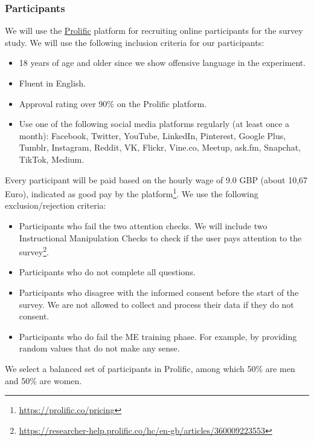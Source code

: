 \subsubsection{Participants}
We will use the \href{https://prolific.co}{Prolific} platform for recruiting online participants for the survey study.
%
We will use the following inclusion criteria for our participants:
\begin{itemize}
    \item 18 years of age and older since we show offensive language in the experiment.
    \item Fluent in English.
    \item Approval rating over 90\% on the Prolific platform.
    \item Use one of the following social media platforms regularly (at least once a month): Facebook, Twitter, YouTube, LinkedIn, Pinterest, Google Plus, Tumblr, Instagram, Reddit, VK, Flickr, Vine.co, Meetup, ask.fm, Snapchat, TikTok, Medium.
\end{itemize}
%
Every participant will be paid based on the hourly wage of 9.0 GBP (about 10,67 Euro), indicated as good pay by the platform\footnote{\url{https://prolific.co/pricing}}.
%
We use the following exclusion/rejection criteria:
\begin{itemize}
    \item Participants who fail the two attention checks. We will include two Instructional Manipulation Checks to check if the user pays attention to the survey\footnote{\url{https://researcher-help.prolific.co/hc/en-gb/articles/360009223553}}.
    \item Participants who do not complete all questions.
    \item Participants who disagree with the informed consent before the start of the survey. We are not allowed to collect and process their data if they do not consent.
    \item Participants who do fail the ME training phase. For example, by providing random values that do not make any sense.
\end{itemize}
%
We select a balanced set of participants in Prolific, among which 50\% are men and 50\% are women.


